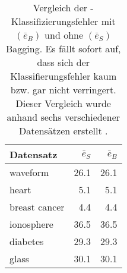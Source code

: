 \begin{table}[h]
    \centering
    \caption{Vergleich der -Klassifizierungsfehler mit $(\bar{e}_B)$ und ohne $(\bar{e}_S)$ Bagging. Es fällt sofort auf, dass sich der Klassifierungsfehler kaum bzw. gar nicht verringert. Dieser Vergleich wurde anhand sechs verschiedener Datensätzen erstellt \autocite[vgl.S.14]{Breiman.1996}.}
    \vspace{4ex}
    \begin{tabular}{lrr}
        \hline
        \textbf{Datensatz} & $\bar{e}_S$ & $\bar{e}_B$ \\
        \hline
        waveform & 26.1 & 26.1 \\
        heart & 5.1 & 5.1 \\
        breast cancer & 4.4 & 4.4 \\
        ionosphere & 36.5 & 36.5 \\
        diabetes & 29.3 & 29.3 \\
        glass & 30.1 & 30.1 \\
        \hline
    \end{tabular}
    \label{tab:ClassificationErrorKNN}
\end{table}

    
